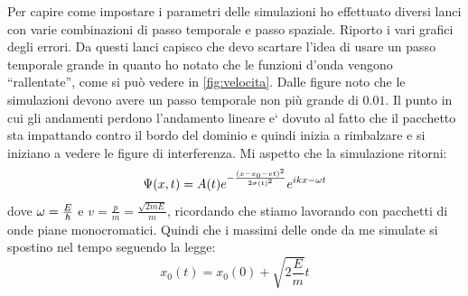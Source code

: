 Per capire come impostare i parametri delle simulazioni ho effettuato diversi lanci con varie combinazioni di passo temporale e passo spaziale. Riporto i vari grafici degli errori.
Da questi lanci capisco che devo scartare l'idea di usare un passo temporale grande in quanto ho notato che le funzioni d'onda vengono ``rallentate'', come si pu\`o vedere in \autoref{fig:velocita}. Dalle figure noto che le simulazioni devono avere un passo temporale non pi\`u grande di $0.01$. Il punto in cui gli andamenti perdono l'andamento lineare e` dovuto al fatto che il pacchetto sta impattando contro il bordo del dominio e quindi inizia a rimbalzare e si iniziano a vedere le figure di interferenza.
Mi aspetto che la simulazione ritorni:
\begin{equation}
\Psi(x,t) = A(t)e^{-\frac{\left( x-x_0- v t \right)^2}{2\sigma(t)^2}}e^{ikx-\omega t}
\end{equation}
dove $\omega = \frac E\hbar$  e $v = \frac{p}{m} =\frac{\sqrt{2m E}}{m} $, ricordando che stiamo lavorando con pacchetti di onde piane monocromatici.
Quindi che i massimi delle onde da me simulate si spostino nel tempo seguendo la legge:
\begin{equation}
x_0(t) = x_0(0)+\sqrt{2\frac{E}{m}} t
\end{equation}
